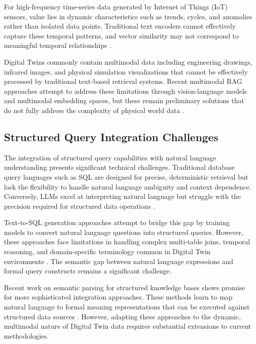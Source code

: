 For high-frequency time-series data generated by Internet of Things (IoT) sensors, value lies in dynamic characteristics such as trends, cycles, and anomalies rather than isolated data points. Traditional text encoders cannot effectively capture these temporal patterns, and vector similarity may not correspond to meaningful temporal relationships \cite{yue2022ts2vec}.

Digital Twins commonly contain multimodal data including engineering drawings, infrared images, and physical simulation visualizations that cannot be effectively processed by traditional text-based retrieval systems. Recent multimodal RAG approaches attempt to address these limitations through vision-language models and multimodal embedding spaces, but these remain preliminary solutions that do not fully address the complexity of physical world data \cite{chen2022murag}.

\subsection{Structured Query Integration Challenges}

The integration of structured query capabilities with natural language understanding presents significant technical challenges. Traditional database query languages such as SQL are designed for precise, deterministic retrieval but lack the flexibility to handle natural language ambiguity and context dependence. Conversely, LLMs excel at interpreting natural language but struggle with the precision required for structured data operations \cite{scholak2021duorat}.

Text-to-SQL generation approaches attempt to bridge this gap by training models to convert natural language questions into structured queries. However, these approaches face limitations in handling complex multi-table joins, temporal reasoning, and domain-specific terminology common in Digital Twin environments \cite{yu2018spider}. The semantic gap between natural language expressions and formal query constructs remains a significant challenge.

Recent work on semantic parsing for structured knowledge bases shows promise for more sophisticated integration approaches. These methods learn to map natural language to formal meaning representations that can be executed against structured data sources \cite{berant2013semantic}. However, adapting these approaches to the dynamic, multimodal nature of Digital Twin data requires substantial extensions to current methodologies.


